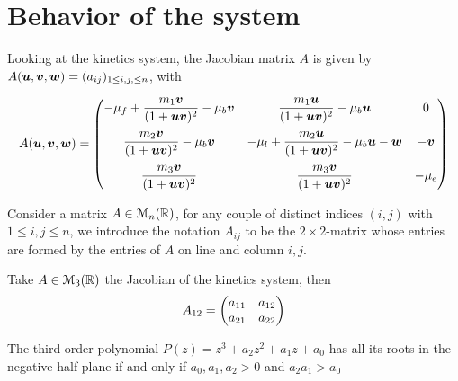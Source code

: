 \section{Behavior of the system}

Looking at the kinetics system, the Jacobian matrix $A$ is given by $A(\bm{u}, \bm{v}, \bm{w}) = (a_{ij})_{1 \le i, j, \le n}$, with

$$
A(\bm{u}, \bm{v}, \bm{w}) = \begin{pmatrix}  -\mu_f +  \dfrac{m_1\bm{v}}{(1+\bm{u} \bm{v})^2} - \mu_b \bm{v} &  \dfrac{m_1 \bm{u}}{(1+\bm{u} \bm{v})^2} - \mu_b \bm{u} & 0 \\[1.2em]
 \dfrac{m_2 \bm{v}}{(1+\bm{u} \bm{v})^2} - \mu_b \bm{v}   & -\mu_l + \dfrac{m_2 \bm{u}}{(1+\bm{u} \bm{v})^2} - \mu_b \bm{u} - \bm{w}  & -\bm{v} \\[1.2em] 
  \dfrac{m_3 \bm{v}}{(1+\bm{u} \bm{v})^2} &  \dfrac{m_3 \bm{v}}{(1+\bm{u} \bm{v})^2} & -\mu_e \end{pmatrix}
$$

\begin{definition}
	Consider a matrix $A \in \EuScript{M}_n(\mathbb{R})$, for any couple of distinct indices $(i, j)$ with $1 \le i, j \le n$, we introduce the notation $A_{ij}$ to be the $2 \! \times \! 2$-matrix whose entries are formed by the entries of $A$ on line and column $i, j$.
\end{definition}

\begin{example}
	Take $A \in \EuScript{M}_3(\mathbb{R})$ the Jacobian of the kinetics system, then
	$$A_{12} = \begin{pmatrix} a_{11} & a_{12} \\  a_{21} & a_{22} \end{pmatrix}$$
\end{example}

\begin{lemma}
	The third order polynomial $P(z) = z^3 + a_2 z^2 + a_1 z + a_0$ has all its roots in the negative half-plane if and only if $a_0, a_1, a_2 > 0$ and $a_2 a_1 > a_0$
\end{lemma}


